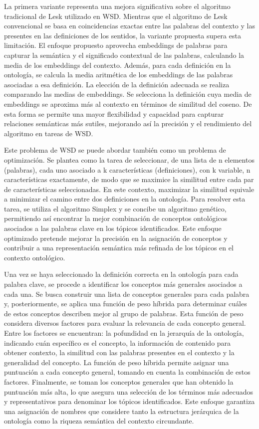 La primera variante representa una mejora significativa sobre el algoritmo tradicional de Lesk utilizado en WSD. Mientras que el algoritmo de Lesk convencional se basa en coincidencias exactas entre las palabras del contexto y las presentes en las definiciones de los sentidos, la variante propuesta supera esta limitación. El enfoque propuesto aprovecha embeddings de palabras para capturar la semántica y el significado contextual de las palabras, calculando la media de los embeddings del contexto. Además, para cada definición en la ontología, se calcula la media aritm\'etica de los embeddings de las palabras asociadas a esa definición. La elección de la definición adecuada se realiza comparando las medias de embeddings. Se selecciona la definición cuya media de embeddings se aproxima más al contexto en términos de similitud del coseno. De esta forma se permite una mayor flexibilidad y capacidad para capturar relaciones semánticas más sutiles, mejorando así la precisión y el rendimiento del algoritmo en tareas de WSD.

Este problema de WSD se puede abordar tambi\'en como un problema de optimizaci\'on. Se plantea como la tarea de seleccionar, de una lista de n elementos (palabras), cada uno asociado a k características (definiciones), con k variable, n características exactamente, de modo que se maximice la similitud entre cada par de características seleccionadas. En este contexto, maximizar la similitud equivale a minimizar el camino entre dos definiciones en la ontolog\'ia. Para resolver esta tarea, se utiliza el algoritmo Simplex y se concibe un algoritmo genético, permitiendo así encontrar la mejor combinación de conceptos ontológicos asociados a las palabras clave en los tópicos identificados. Este enfoque optimizado pretende mejorar la precisión en la asignación de conceptos y contribuir a una representación semántica más refinada de los tópicos en el contexto ontológico.

Una vez se haya seleccionado la definici\'on correcta en la ontología para cada palabra clave, se procede a identificar los conceptos más generales asociados a cada una. Se busca construir una lista de conceptos generales para cada palabra y, posteriormente, se aplica una función de peso híbrida para determinar cu\'ales de estos conceptos describen mejor al grupo de palabras. Esta función de peso considera diversos factores para evaluar la relevancia de cada concepto general. Entre los factores se encuentran: la pofundidad en la jerarquía de la ontología, indicando cuán específico es el concepto, la información de contenido para obtener contexto, la similitud con las palabras presentes en el contexto y la generalidad del concepto. La función de peso híbrida permite asignar una puntuación a cada concepto general, tomando en cuenta la combinación de estos factores. Finalmente, se toman los conceptos generales que han obtenido la puntuación más alta, lo que asegura una selección de los términos más adecuados y representativos para denominar los tópicos identificados. Este enfoque garantiza una asignación de nombres que considere tanto la estructura jerárquica de la ontología como la riqueza semántica del contexto circundante.

